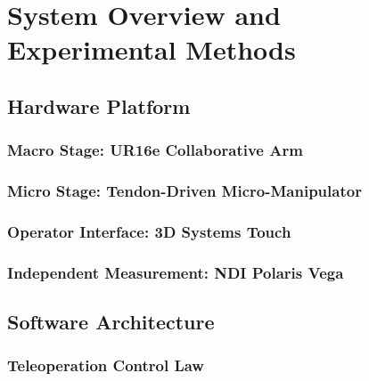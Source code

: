 \chapter{System Overview and Experimental Methods}
\label{ch:methods}

\section{Hardware Platform}
\label{sec:methods-hardware}

\subsection{Macro Stage: UR16e Collaborative Arm}
\label{sec:methods-ur16e}

\subsection{Micro Stage: Tendon-Driven Micro-Manipulator}
\label{sec:methods-micro}

\subsection{Operator Interface: 3D Systems Touch}
\label{sec:methods-touch}

\subsection{Independent Measurement: NDI Polaris Vega}
\label{sec:methods-ndi}

\section{Software Architecture}
\label{sec:methods-software}

\subsection{Teleoperation Control Law}
\label{sec:methods-control-law}

